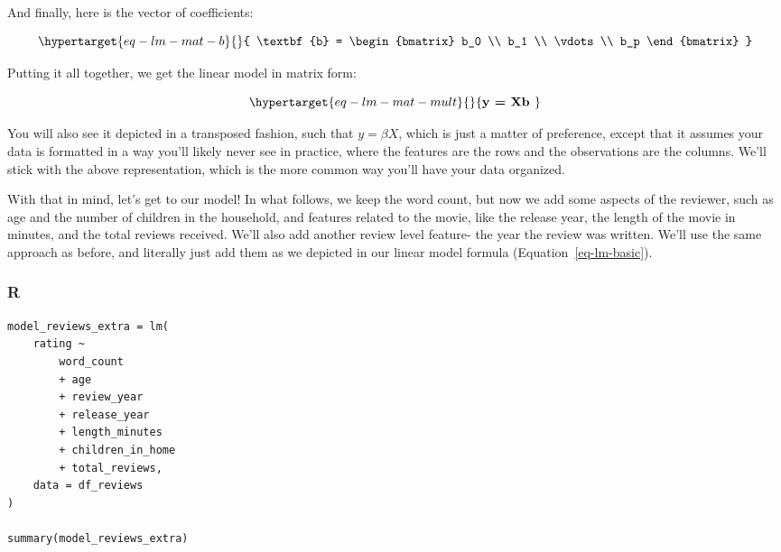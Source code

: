 \documentclass[
  letterpaper,
]{krantz}
\begin{document}
\begin{tcolorbox}[enhanced jigsaw, toprule=.15mm, arc=.35mm, rightrule=.15mm, bottomrule=.15mm, leftrule=.75mm, breakable, colframe=quarto-callout-note-color-frame, colback=white, left=2mm, opacityback=0]
And finally, here is the vector of coefficients:

\begin{equation}\protect\hypertarget{eq-lm-mat-b}{}{
\textbf{b} = \begin{bmatrix}
b_0 \\
b_1 \\
\vdots \\
b_p
\end{bmatrix}
}\label{eq-lm-mat-b}\end{equation}

Putting it all together, we get the linear model in matrix form:

\begin{equation}\protect\hypertarget{eq-lm-mat-mult}{}{
\textbf{y = Xb }
}\label{eq-lm-mat-mult}\end{equation}

You will also see it depicted in a transposed fashion, such that
\(y = \beta X\), which is just a matter of preference, except that it
assumes your data is formatted in a way you'll likely never see in
practice, where the features are the rows and the observations are the
columns. We'll stick with the above representation, which is the more
common way you'll have your data organized.

\end{tcolorbox}

With that in mind, let's get to our model! In what follows, we keep the
word count, but now we add some aspects of the reviewer, such as age and
the number of children in the household, and features related to the
movie, like the release year, the length of the movie in minutes, and
the total reviews received. We'll also add another review level feature-
the year the review was written. We'll use the same approach as before,
and literally just add them as we depicted in our linear model formula
(Equation~\ref{eq-lm-basic}).

\subsubsection{R}

\begin{verbatim}
model_reviews_extra = lm(
    rating ~
        word_count
        + age
        + review_year
        + release_year
        + length_minutes
        + children_in_home
        + total_reviews,
    data = df_reviews
)

summary(model_reviews_extra)
\end{verbatim}
\end{document}
